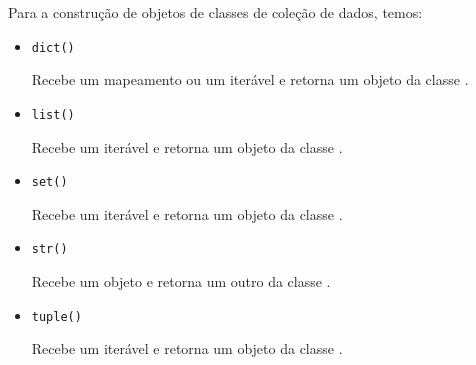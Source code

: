 Para a construção de objetos de classes de coleção de dados, temos:
\begin{itemize}
\item \lstinline+dict()+ 

  Recebe um mapeamento ou um iterável e retorna um objeto da classe {\PYTHONdict}.

\item \lstinline+list()+ 

  Recebe um iterável e retorna um objeto da classe {\PYTHONlist}.

\item \lstinline+set()+ 

  Recebe um iterável e retorna um objeto da classe {\PYTHONset}.

\item \lstinline+str()+ 

  Recebe um objeto e retorna um outro da classe {\PYTHONstr}.

\item \lstinline+tuple()+ 

  Recebe um iterável e retorna um objeto da classe {\PYTHONtuple}.
\end{itemize}

